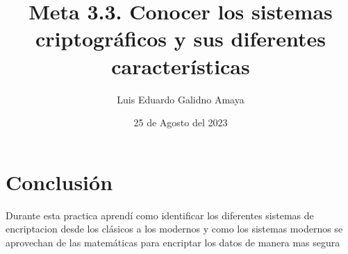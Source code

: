 \documentclass[11pt]{article}
\author{Luis Eduardo Galidno Amaya}
\date{25 de Agosto del 2023}
\title{Meta 3.3. Conocer los sistemas criptográficos y sus diferentes características}
\begin{document}

\pagebreak


\section{Conclusión}
\label{sec:orgc6b426e}
Durante esta practica aprendí como identificar los diferentes sistemas de 
encriptacion desde los clásicos a los modernos y como los sistemas modernos 
se aprovechan de las matemáticas para encriptar los datos de manera mas segura
\end{document}

